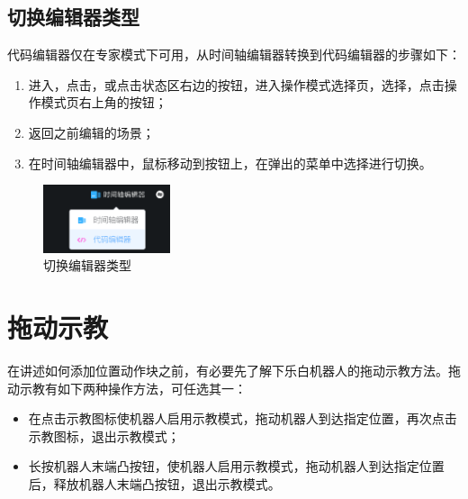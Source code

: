\clearpage

\subsection{切换编辑器类型}

代码编辑器仅在专家模式下可用，从时间轴编辑器转换到代码编辑器的步骤如下：
\begin{enumerate}
\item 进入，点击，或点击状态区右边的\colorbox{Black}{}按钮，进入操作模式选择页，选择，点击操作模式页右上角的按钮；
\item 返回之前编辑的场景；
\item 在时间轴编辑器中，鼠标移动到按钮上，在弹出的菜单中选择进行切换。
\end{enumerate}

\begin{figure}[H]
	\centering
	\includegraphics[height=2cm]{screen/3-3.png}
	\caption{切换编辑器类型}
	\label{fig:切换编辑器类型}
\end{figure}


\vfill

\clearpage


\section{拖动示教}
在讲述如何添加位置动作块之前，有必要先了解下乐白机器人的拖动示教方法。拖动示教有如下两种操作方法，可任选其一：
\begin{itemize}
	\item 在\LM 点击示教图标使机器人启用示教模式，拖动机器人到达指定位置，再次点击示教图标，退出示教模式；
	\item 长按机器人末端凸按钮，使机器人启用示教模式，拖动机器人到达指定位置后，释放机器人末端凸按钮，退出示教模式。
\end{itemize}

